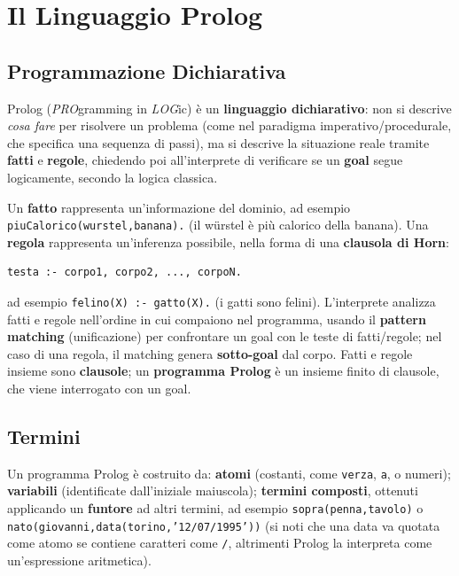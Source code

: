 \documentclass[a4paper,11pt]{article}
\begin{document}
\newpage
\section{Il Linguaggio Prolog}
\label{sec:prolog-lang}

\subsection{Programmazione Dichiarativa}

Prolog (\emph{PRO}gramming in \emph{LOG}ic) è un \textbf{linguaggio dichiarativo}: non si descrive \emph{cosa fare} per risolvere un problema (come nel paradigma imperativo/procedurale, che specifica una sequenza di passi), ma si descrive la situazione reale tramite \textbf{fatti} e \textbf{regole}, chiedendo poi all'interprete di verificare se un \textbf{goal} segue logicamente, secondo la logica classica.

Un \textbf{fatto} rappresenta un'informazione del dominio, ad esempio \texttt{piuCalorico(wurstel,banana).} (il würstel è più calorico della banana). Una \textbf{regola} rappresenta un'inferenza possibile, nella forma di una \textbf{clausola di Horn}:
\begin{lstlisting}
testa :- corpo1, corpo2, ..., corpoN.
\end{lstlisting}
ad esempio \texttt{felino(X) :- gatto(X).} (i gatti sono felini). L'interprete analizza fatti e regole nell'ordine in cui compaiono nel programma, usando il \textbf{pattern matching} (unificazione) per confrontare un goal con le teste di fatti/regole; nel caso di una regola, il matching genera \textbf{sotto-goal} dal corpo. Fatti e regole insieme sono \textbf{clausole}; un \textbf{programma Prolog} è un insieme finito di clausole, che viene interrogato con un goal.

\subsection{Termini}

Un programma Prolog è costruito da: \textbf{atomi} (costanti, come \texttt{verza}, \texttt{a}, o numeri); \textbf{variabili} (identificate dall'iniziale maiuscola); \textbf{termini composti}, ottenuti applicando un \textbf{funtore} ad altri termini, ad esempio \texttt{sopra(penna,tavolo)} o \texttt{nato(giovanni,data(torino,'12/07/1995'))} (si noti che una data va quotata come atomo se contiene caratteri come \texttt{/}, altrimenti Prolog la interpreta come un'espressione aritmetica).
\end{document}

